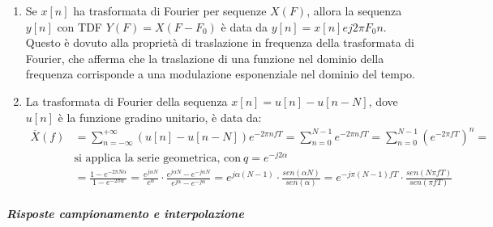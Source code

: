 \documentclass[
]{article}
\begin{document}
\begin{enumerate}
\item
  Se \(x[n]\) ha trasformata di Fourier per sequenze \(X(F)\), allora la
  sequenza \(y[n]\) con TDF \(Y(F)=X(F-F_0)\) è data da
  \(y[n]=x[n]ej2\pi F_0n\). Questo è dovuto alla proprietà di
  traslazione in frequenza della trasformata di Fourier, che afferma che
  la traslazione di una funzione nel dominio della frequenza corrisponde
  a una modulazione esponenziale nel dominio del tempo.
\item
  La trasformata di Fourier della sequenza \(x[n]=u[n]-u[n-N]\), dove
  \(u[n]\) è la funzione gradino unitario, è data da: \begin{align*}
  \displaystyle \overline{X}(f) &= \sum_{n = -\infty}^{+\infty} (u[n]-u[n-N])e^{-2\pi nfT} = \sum_{n = 0}^{N-1}e^{-2\pi nfT} = \sum_{n = 0}^{N-1}(e^{-2\pi fT})^n = \\
  &\text{si applica la serie geometrica, con} \ q = e^{-j2\alpha}& \\
  &= \frac{1-e^{-2\pi N\alpha}}{1-e^{-2\pi \alpha}} = \frac{e^{j \alpha N}}{e^{\alpha}} \cdot \frac{e^{j\alpha N} - e^{-j\alpha N}}{e^{j\alpha } - e^{-j\alpha }} = e^{j \alpha (N-1)} \cdot \frac{sen(\alpha N)}{sen(\alpha)} = e^{-j\pi (N-1)fT} \cdot \frac{sen(N\pi fT)}{sen(\pi fT)}
  \end{align*}
\end{enumerate}

\subparagraph{Risposte campionamento e
interpolazione}\label{risposte-campionamento-e-interpolazione}
\end{document}
